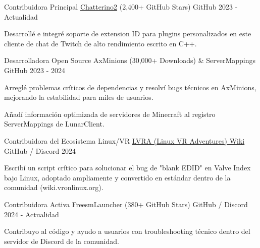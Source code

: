 \documentclass[11pt, a4paper]{awesome-cv}
\begin{document}
\begin{cventries}

  \cventry
    {Contribuidora Principal}
    {\href{https://github.com/Chatterino/chatterino2}{Chatterino2} (2,400+ GitHub Stars)}
    {GitHub}
    {2023 - Actualidad}
    {
      \begin{cvitems}
        \item {Desarrollé e integré soporte de extension ID para plugins personalizados en este cliente de chat de Twitch de alto rendimiento escrito en C++.}
      \end{cvitems}
    }

  \cventry
    {Desarrolladora Open Source}
    {AxMinions (30,000+ Downloads) \& ServerMappings}
    {GitHub}
    {2023 - 2024}
    {
      \begin{cvitems}
        \item {Arreglé problemas críticos de dependencias y resolví bugs técnicos en AxMinions, mejorando la estabilidad para miles de usuarios.}
        \item {Añadí información optimizada de servidores de Minecraft al registro ServerMappings de LunarClient.}
      \end{cvitems}
    }

  \cventry
    {Contribuidora del Ecosistema Linux/VR}
    {\href{https://wiki.vronlinux.org/}{LVRA (Linux VR Adventures) Wiki}}
    {GitHub / Discord}
    {2024}
    {
      \begin{cvitems}
        \item {Escribí un script crítico para solucionar el bug de "blank EDID" en Valve Index bajo Linux, adoptado ampliamente y convertido en estándar dentro de la comunidad (wiki.vronlinux.org).}
      \end{cvitems}
    }
  
  \cventry
    {Contribuidora Activa}
    {FreesmLauncher (380+ GitHub Stars)}
    {GitHub / Discord}
    {2024 - Actualidad}
    {
      \begin{cvitems}
        \item {Contribuyo al código y ayudo a usuarios con troubleshooting técnico dentro del servidor de Discord de la comunidad.}
      \end{cvitems}
    }

\end{cventries}
\end{document}
